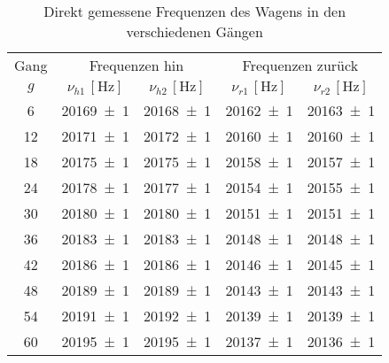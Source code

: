 \begin{table}[!h]
	\centering
	\begin{tabular}{|c|c|c|c|c|}
		\hline
		Gang & \multicolumn{2}{c|}{Frequenzen hin} & \multicolumn{2}{c|}{Frequenzen zurück}\\
		$g$ & $\nu_{h1}\,[\si{\hertz}]$ & $\nu_{h2}\,[\si{\hertz}]$ & $\nu_{r1}\,[\si{\hertz}]$ & $\nu_{r2}\,[\si{\hertz}]$\\\hline\hline
		\num{6}  & \num{20169(1)}  & \num{20168(1)}  & \num{20162(1)}  & \num{20163(1)} \\
		\num{12}  & \num{20171(1)}  & \num{20172(1)}  & \num{20160(1)}  & \num{20160(1)} \\
		\num{18}  & \num{20175(1)}  & \num{20175(1)}  & \num{20158(1)}  & \num{20157(1)} \\
		\num{24}  & \num{20178(1)}  & \num{20177(1)}  & \num{20154(1)}  & \num{20155(1)} \\
		\num{30}  & \num{20180(1)}  & \num{20180(1)}  & \num{20151(1)}  & \num{20151(1)} \\
		\num{36}  & \num{20183(1)}  & \num{20183(1)}  & \num{20148(1)}  & \num{20148(1)} \\
		\num{42}  & \num{20186(1)}  & \num{20186(1)}  & \num{20146(1)}  & \num{20145(1)} \\
		\num{48}  & \num{20189(1)}  & \num{20189(1)}  & \num{20143(1)}  & \num{20143(1)} \\
		\num{54}  & \num{20191(1)}  & \num{20192(1)}  & \num{20139(1)}  & \num{20139(1)} \\
		\num{60}  & \num{20195(1)}  & \num{20195(1)}  & \num{20137(1)}  & \num{20136(1)} \\
		\hline
	\end{tabular}
	\caption{Direkt gemessene Frequenzen des Wagens in den verschiedenen Gängen \label{tab:Auswertung_Frequenz_Direkt}}
\end{table}